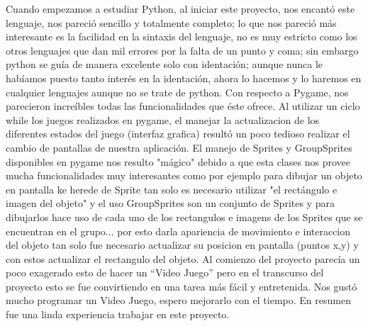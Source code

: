 \documentclass[12pt]{report}
\begin{document}
Cuando empezamos a estudiar Python, al iniciar este proyecto, nos encantó este lenguaje, nos pareció sencillo y totalmente completo; lo que nos pareció más interesante es la facilidad en la sintaxis del lenguaje, no es muy estricto como los otros lenguajes que dan mil errores por la falta de un punto y coma; sin embargo python se guía de manera excelente solo con identación; aunque nunca le habíamos puesto tanto interés en la identación, ahora lo hacemos  y lo haremos en cualquier lenguajes aunque no se trate de python.
\newline
\newline
Con respecto a Pygame, nos parecieron increíbles todas las funcionalidades que éste ofrece.
Al utilizar un ciclo while los juegos realizados en pygame, el manejar la actualizacion de los diferentes estados del juego (interfaz grafica) resultó un poco tedioso realizar el cambio de pantallas de nuestra aplicación.
\newline
\newline
El manejo de Sprites y GroupSprites disponibles en pygame nos resulto "mágico" debido a que esta clases nos provee mucha funcionalidades muy interesantes como por ejemplo para dibujar un objeto en pantalla ke herede de Sprite tan solo es necesario utilizar "el rectángulo e imagen del objeto" y el uso GroupSprites son un conjunto de Sprites y para dibujarlos hace uso de cada uno de los rectangulos e imagens de los Sprites que se encuentran en el grupo...
por esto darla apariencia de movimiento e interaccion del objeto tan solo fue necesario actualizar su posicion en pantalla (puntos x,y) y con estos actualizar el rectangulo del objeto.
\newline
\newline
Al comienzo del proyecto parecía un poco exagerado esto de hacer un “Video Juego” pero en el transcurso del proyecto esto se fue convirtiendo en una tarea más fácil y entretenida. Nos gustó mucho programar un Video Juego, espero mejorarlo con el tiempo.
En resumen fue una linda experiencia trabajar en este proyecto.
\end{document}
